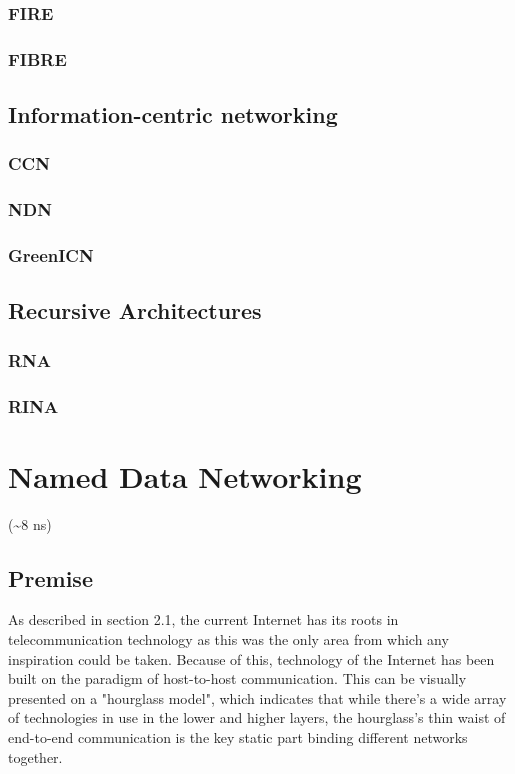         \subsection{FIRE}
        \subsection{FIBRE}

    \section{Information-centric networking}

        \subsection{CCN}
        \subsection{NDN}
        \subsection{GreenICN}

    \section{Recursive Architectures}
        \subsection{RNA}
        \subsection{RINA}

\chapter{Named Data Networking}
    (\textasciitilde8 ns)
    \section{Premise}
        As described in section 2.1, the current Internet has its roots in telecommunication technology as this was the only area from which any inspiration could be taken. Because of this, technology of the Internet has been built on the paradigm of host-to-host communication. This can be visually presented on a "hourglass model", which indicates that while there's a wide array of technologies in use in the lower and higher layers, the hourglass's thin waist of end-to-end communication is the key static part binding different networks together.

